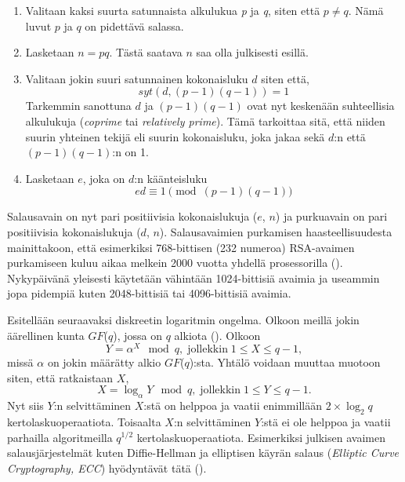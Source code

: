   \begin{enumerate}
  
      \item Valitaan kaksi suurta satunnaista alkulukua \emph{p} ja \emph{q}, siten että $p \neq q$. Nämä luvut $p$ ja $q$ on pidettävä salassa.
      
      \item Lasketaan $n = pq$. Tästä saatava $n$ saa olla julkisesti esillä.
      
      \item Valitaan jokin suuri satunnainen kokonaisluku $d$ siten että,
      \[syt(d, (p-1)(q-1)) = 1\]
      Tarkemmin sanottuna $d$ ja $(p-1)(q-1)$ ovat nyt keskenään suhteellisia alkulukuja (\emph{coprime} tai \emph{relatively prime}). Tämä tarkoittaa sitä, että niiden suurin yhteinen tekijä eli suurin kokonaisluku, joka jakaa sekä $d$:n että $(p-1)(q-1)$:n on 1.
      
      \item Lasketaan $e$, joka on $d$:n käänteisluku
      \[e d \equiv 1 \pmod{(p-1) (q-1)}\]
  \end{enumerate}
  Salausavain on nyt pari positiivisia kokonaislukuja ($e$, $n$) ja purkuavain on pari positiivisia kokonaislukuja ($d$, $n$). Salausavaimien purkamisen haasteellisuudesta mainittakoon, että esimerkiksi 768-bittisen (232 numeroa) RSA-avaimen purkamiseen kuluu aikaa melkein 2000 vuotta yhdellä prosessorilla (\cite{buchmann2016post}). Nykypäivänä yleisesti käytetään vähintään 1024-bittisiä avaimia ja useammin jopa pidempiä kuten 2048-bittisiä tai 4096-bittisiä avaimia.
  
 Esitellään seuraavaksi diskreetin logaritmin ongelma. Olkoon meillä jokin äärellinen kunta $GF$($q$), jossa on $q$ alkiota (\cite{1055638}). Olkoon
 \begin{equation}
     \label{eq10}
     Y = \alpha^{X} \mod q, \; \text{jollekkin} \; 1 \leq X \leq q-1,
 \end{equation}
 missä $\alpha$ on jokin määrätty alkio $GF$($q$):sta. Yhtälö voidaan muuttaa muotoon siten, että ratkaistaan $X$, 
 \begin{equation}
     \label{eq11}
     X = \log_{\alpha} Y \mod q, \; \text{jollekkin} \; 1 \leq Y \leq q-1.
 \end{equation}
 Nyt siis $Y$:n selvittäminen $X$:stä on helppoa ja vaatii enimmillään $2 \times \log_{2}q$ kertolaskuoperaatiota. Toisaalta $X$:n selvittäminen $Y$:stä ei ole helppoa ja vaatii parhailla algoritmeilla $q^{1/2}$ kertolaskuoperaatiota. Esimerkiksi julkisen avaimen salausjärjestelmät kuten Diffie-Hellman ja elliptisen käyrän salaus (\emph{Elliptic Curve Cryptography, ECC}) hyödyntävät tätä (\cite{mavroeidis2018impact}).
 
